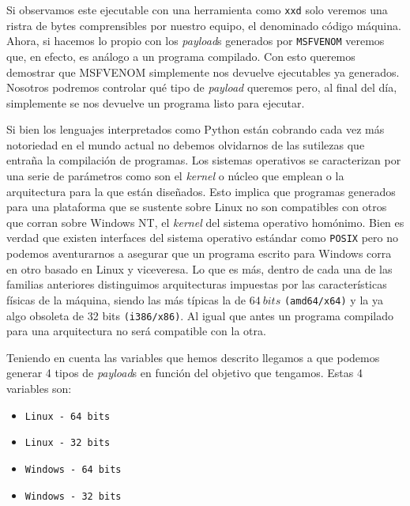 \documentclass[12pt]{article}
\newcommand{\newpar} {
    \vskip 0.5cm
}
\begin{document}
                \newpar

                Si observamos este ejecutable con una herramienta como \texttt{xxd} solo veremos una ristra de bytes comprensibles por nuestro equipo, el denominado código máquina. Ahora, si hacemos lo propio con los \textit{payload}s generados por \texttt{MSFVENOM} veremos que, en efecto, es análogo a un programa compilado. Con esto queremos demostrar que MSFVENOM simplemente nos devuelve ejecutables ya generados. Nosotros podremos controlar qué tipo de \textit{payload} queremos pero, al final del día, simplemente se nos devuelve un programa listo para ejecutar.

                \newpar

                Si bien los lenguajes interpretados como Python están cobrando cada vez más notoriedad en el mundo actual no debemos olvidarnos de las sutilezas que entraña la compilación de programas. Los sistemas operativos se caracterizan por una serie de parámetros como son el \textit{kernel} o núcleo que emplean o la arquitectura para la que están diseñados. Esto implica que programas generados para una plataforma que se sustente sobre Linux no son compatibles con otros que corran sobre Windows NT, el \textit{kernel} del sistema operativo homónimo. Bien es verdad que existen interfaces del sistema operativo estándar como \texttt{POSIX} pero no podemos aventurarnos a asegurar que un programa escrito para Windows corra en otro basado en Linux y viceveresa. Lo que es más, dentro de cada una de las familias anteriores distinguimos arquitecturas impuestas por las características físicas de la máquina, siendo las más típicas la de $64\ bits$ \texttt{(amd64/x64)} y la ya algo obsoleta de 32 bits \texttt{(i386/x86)}. Al igual que antes un programa compilado para una arquitectura no será compatible con la otra.

                \newpar

                Teniendo en cuenta las variables que hemos descrito llegamos a que podemos generar 4 tipos de \textit{payload}s en función del objetivo que tengamos. Estas 4 variables son:

                \begin{itemize}
                    \item \texttt{Linux - 64 bits}
                    \item \texttt{Linux - 32 bits}
                    \item \texttt{Windows - 64 bits}
                    \item \texttt{Windows - 32 bits}
                \end{itemize}
\end{document}
